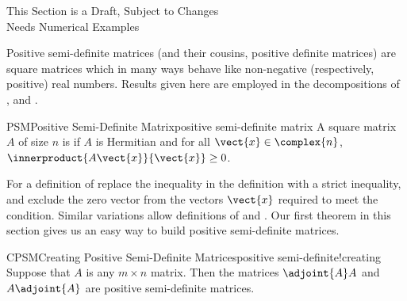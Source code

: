 %
{\sc\large This Section is a Draft, Subject to Changes}\\
{\sc\large Needs Numerical Examples}\par\bigskip
%
Positive semi-definite matrices (and their cousins, positive definite matrices) are square matrices which in many ways behave like non-negative (respectively, positive) real numbers.  Results given here are employed in the decompositions of ,  and .
%
%
\begin{definition}{PSM}{Positive Semi-Definite Matrix}{positive semi-definite matrix}
A square matrix $A$ of size $n$ is  if $A$ is Hermitian and for all $\vect{x}\in\complex{n}$, $\innerproduct{A\vect{x}}{\vect{x}}\geq 0$.
\end{definition}
%
For a definition of  replace the inequality in the definition with a strict inequality, and exclude the zero vector from the vectors $\vect{x}$ required to meet the condition.  Similar variations allow definitions of  and .
%
%
Our first theorem in this section gives us an easy way to build positive semi-definite matrices.
%
\begin{theorem}{CPSM}{Creating Positive Semi-Definite Matrices}{positive semi-definite!creating}
Suppose that $A$ is any $m\times n$ matrix.  Then the matrices $\adjoint{A}A$ and $A\adjoint{A}$ are positive semi-definite matrices.
\end{theorem}
%
